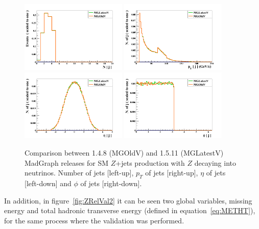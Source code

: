 \begin{figure}[!Hhtbp]
  \begin{center}
    \includegraphics[width=0.45\textwidth]{figs/ZjetsRelVal0.png}
    \includegraphics[width=0.45\textwidth]{figs/ZjetsRelVal1.png}
    \includegraphics[width=0.45\textwidth]{figs/ZjetsRelVal2.png}
    \includegraphics[width=0.45\textwidth]{figs/ZjetsRelVal3.png}
    \caption{Comparison between 1.4.8 (MGOldV) and 1.5.11 (MGLatestV) MadGraph releases for SM $Z$+jets production with $Z$ decaying into neutrinos. Number of jets [left-up], $p_{T}$ of jets [right-up], $\eta$ of jets [left-down] and $\phi$ of jets [right-down].}
    \label{fig:ZRelVal1}
  \end{center}
\end{figure}

In addition, in figure~\ref{fig:ZRelVal2} it can be seen two global variables, missing energy and total hadronic transverse energy (defined in equation~\ref{eq:METHT}), for the same process where the validation was performed.

